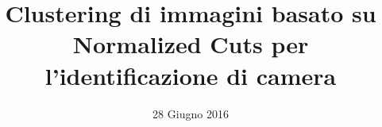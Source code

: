\documentclass{beamer}
\author{}
\title{\huge Clustering di immagini basato su Normalized Cuts per l’identificazione di camera}
\date{28 Giugno 2016}
\begin{document}
\titlepageframe







\end{document}
